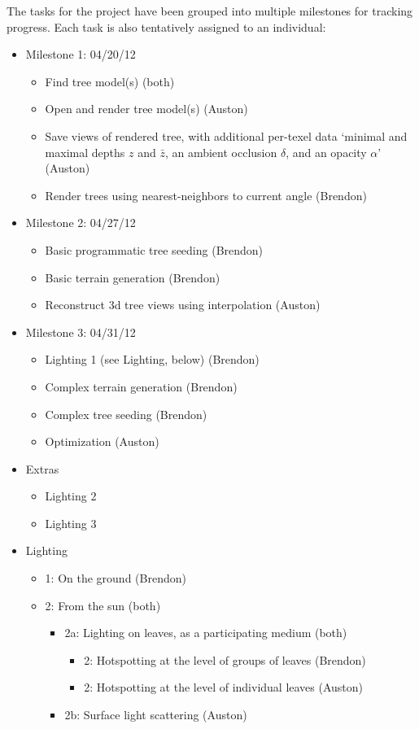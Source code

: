 \documentclass{article}
\begin{document}
The tasks for the project have been grouped into multiple milestones for tracking progress.  Each task is also tentatively assigned to an individual:

\begin{itemize}
\item Milestone 1: 04/20/12
\begin{itemize}
\item Find tree model(s) (both)
\item Open and render tree model(s) (Auston)
\item Save views of rendered tree, with additional per-texel data ‘minimal and maximal depths $z$ and $\bar{z}$, an ambient occlusion $\delta$, and an opacity $\alpha$’\cite{trees} (Auston)
\item Render trees using nearest-neighbors to current angle (Brendon)
\end{itemize}

\item Milestone 2: 04/27/12
\begin{itemize}
\item Basic programmatic tree seeding (Brendon)
\item Basic terrain generation (Brendon)
\item Reconstruct 3d tree views using interpolation (Auston)
\end{itemize}

\item Milestone 3: 04/31/12
\begin{itemize}
\item Lighting 1 (see Lighting, below) (Brendon)
\item Complex terrain generation (Brendon)
\item Complex tree seeding (Brendon)
\item Optimization (Auston)
\end{itemize}

\item Extras
\begin{itemize}
\item Lighting 2
\item Lighting 3
\end{itemize}

\item Lighting 
\begin{itemize}
\item 1: On the ground (Brendon)
\item 2: From the sun (both)
\begin{itemize}
\item 2a: Lighting on leaves, as a participating medium (both)
\begin{itemize}
\item 2: Hotspotting at the level of groups of leaves (Brendon)
\item 2: Hotspotting at the level of individual leaves (Auston)
\end{itemize}
\item 2b: Surface light scattering (Auston)
\end{itemize}


\end{itemize}
\end{itemize}
\end{document}
